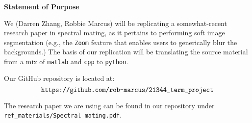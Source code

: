 \documentclass[11pt]{article}
\begin{document}
\textbf{Statement of Purpose}

We (Darren Zhang, Robbie Marcus) will be replicating a somewhat-recent research paper in spectral mating, as it pertains to performing soft image segmentation (e.g., the \verb|Zoom| feature that enables users to generically blur the backgrounds.) The basis of our replication will be translating the source material from a mix of \verb|matlab| and \verb|cpp| to \verb|python|.

Our GitHub repository is located at: $$\verb|https://github.com/rob-marcus/21344_term_project|$$

The research paper we are using can be found in our repository under \verb|ref_materials/Spectral mating.pdf|.
\end{document}
